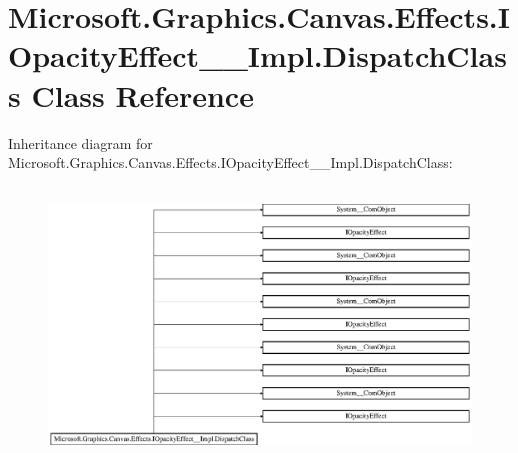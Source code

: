 \hypertarget{class_microsoft_1_1_graphics_1_1_canvas_1_1_effects_1_1_i_opacity_effect_____impl_1_1_dispatch_class}{}\section{Microsoft.\+Graphics.\+Canvas.\+Effects.\+I\+Opacity\+Effect\+\_\+\+\_\+\+Impl.\+Dispatch\+Class Class Reference}
\label{class_microsoft_1_1_graphics_1_1_canvas_1_1_effects_1_1_i_opacity_effect_____impl_1_1_dispatch_class}
Inheritance diagram for Microsoft.\+Graphics.\+Canvas.\+Effects.\+I\+Opacity\+Effect\+\_\+\+\_\+\+Impl.\+Dispatch\+Class\+:\begin{figure}[H]
\begin{center}
\leavevmode
\includegraphics[height=7.298578cm]{class_microsoft_1_1_graphics_1_1_canvas_1_1_effects_1_1_i_opacity_effect_____impl_1_1_dispatch_class}
\end{center}
\end{figure}
